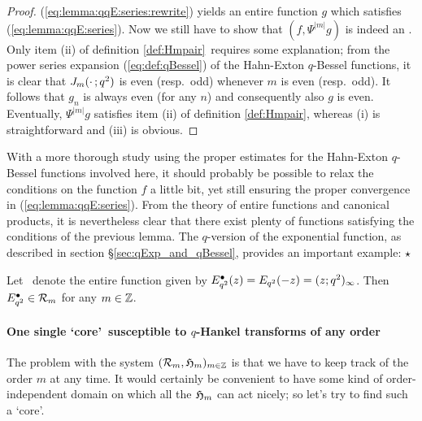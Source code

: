 \begin{proof}
(\ref{eq:lemma:qqE:series:rewrite}) yields an entire function $g$ which
satisfies (\ref{eq:lemma:qqE:series}).
Now we still have to show that $(f, \Psi^{|m|} g)$
is indeed an \Hmpair\@. Only item (ii) of definition \ref{def:Hmpair}\
requires some explanation; from the power series expansion (\ref{eq:def:qBessel})
of the Hahn-Exton $q$-Bessel functions, it is clear that
$J_{m}(\cdot\,; q^2)$ is even (resp.\ odd) whenever $m$ is even (resp.\ odd).
It follows that $g_n$ is always even (for any $n$) and consequently
also $g$ is even. Eventually, $\Psi^{|m|} g$ satisfies item (ii) of
definition \ref{def:Hmpair}, whereas (i) is straight\-forward and (iii) is obvious.
\end{proof}


\begin{remark} \rm
With a more thorough study using the proper estimates for the
Hahn-Exton $q$-Bessel functions involved here, it should probably
be possible to relax the conditions on  the function $f$ a little bit,
yet still ensuring the proper convergence in (\ref{eq:lemma:qqE:series}).
From the theory of entire functions and canonical products, it is nevertheless
clear that there exist plenty of functions satisfying the conditions of the
previous lemma. The $q$-version of the exponential function, as
described in section \S\ref{sec:qExp_and_qBessel}, provides an important example:
$\hfill \star$
\end{remark}



\begin{cor} \label{cor:qqE_in_holS}
Let \qqE\ denote the entire function given by
$E_{q^2}^\bullet(z) = E_{q^2}(-z) = (z;q^2)_\infty$.
Then $E_{q^2}^\bullet \in {\mathcal R}_{m}$ for any $m\in \mathbb{Z}$.
\end{cor}

\paragraph{One single \lq core\rq\ susceptible to $q$-Hankel transforms of any order}
The problem with the system $({\mathcal R}_{m},\mathfrak{H}_{m})_{m\in \mathbb{Z}}$
is that we have to keep track of the order $m$ at any time.
It would certainly be convenient to have some kind of order-independent
domain on which all the $\mathfrak{H}_{m}$ can act nicely;
so let's try to find such a \lq core\rq.

